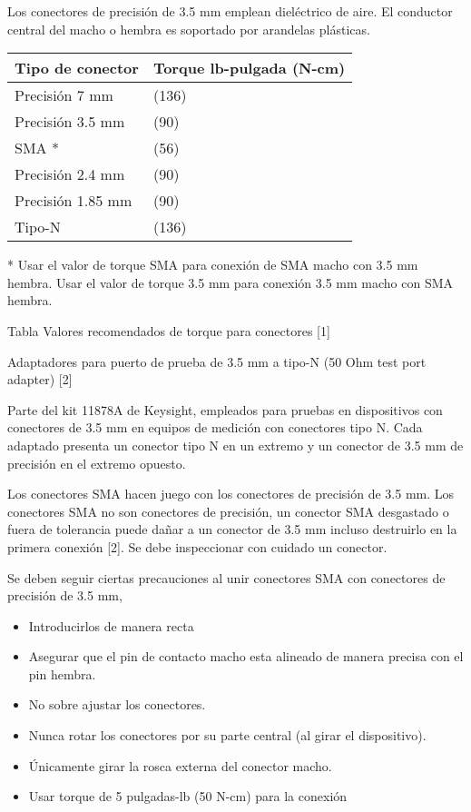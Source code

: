 Los conectores de precisión de 3.5 mm emplean dieléctrico de aire. El conductor central del macho o hembra es soportado
por arandelas plásticas.

\begin{center}
	\tablefirsthead{}
	\tablehead{}
	\tabletail{}
	\tablelasttail{}
	\begin{supertabular}{|m{2.952cm}|m{4.323cm}|}
		\hline
		\centering Tipo de conector &
		\centering Torque lb-pulgada (N-cm)\\\hline
		\centering Precisión 7 mm &
		 (136)\\\hline
		\centering Precisión 3.5 mm &
		 (90)\\\hline
		\centering SMA * &
		 (56)\\\hline
		\centering Precisión 2.4 mm &
		 (90)\\\hline
		\centering Precisión 1.85 mm &
		 (90)\\\hline
		\centering Tipo-N &
		 (136)\\\hline
	\end{supertabular}
\end{center}

* Usar el valor de torque SMA para conexión de SMA macho con 3.5 mm hembra. Usar el valor de torque 3.5 mm para conexión
3.5 mm macho con SMA hembra.

Tabla Valores recomendados de torque para conectores [1]

Adaptadores para puerto de prueba de 3.5 mm a tipo-N (50 Ohm test port adapter) [2]

Parte del kit 11878A de Keysight, empleados para pruebas en dispositivos con conectores de 3.5 mm en equipos de medición
con conectores tipo N. Cada adaptado presenta un conector tipo N en un extremo y un conector de 3.5 mm de precisión en
el extremo opuesto.

Los conectores SMA hacen juego con los conectores de precisión de 3.5 mm. Los conectores SMA no son conectores de
precisión, un conector SMA desgastado o fuera de tolerancia puede dañar a un conector de 3.5 mm incluso destruirlo en
la primera conexión [2]. Se debe inspeccionar con cuidado un conector.

Se deben seguir ciertas precauciones al unir conectores SMA con conectores de precisión de 3.5 mm,

\begin{itemize}
	\item Introducirlos de manera recta
	\item Asegurar que el pin de contacto macho esta alineado de manera precisa con el pin hembra.
	\item No sobre ajustar los conectores.
	\item Nunca rotar los conectores por su parte central (al girar el dispositivo).
	\item Únicamente girar la rosca externa del conector macho.
	\item Usar torque de 5 pulgadas-lb (50 N-cm) para la conexión
\end{itemize}


